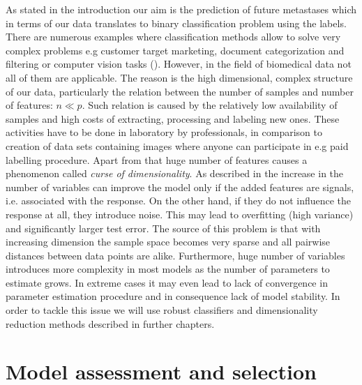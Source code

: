 \documentclass[shortabstract, english, mgr]{iithesis}
\begin{document}
As stated in the introduction our aim is the prediction of future metastases which in terms of our data translates to binary classification problem using the labels. There are numerous examples where classification methods allow to solve very complex problems e.g customer target marketing, document categorization and filtering or computer vision tasks (\cite{dataClassification}). However, in the field of biomedical data not all of them are applicable. The reason is the high dimensional, complex structure of our data, particularly the relation between the number of samples and number of features: $n \ll p$. Such relation is caused by the relatively low availability of samples and high costs of extracting, processing and labeling new ones. These activities have to be done in laboratory by professionals, in comparison to creation of data sets containing images where anyone can participate in e.g paid labelling procedure. Apart from that huge number of features causes a phenomenon called \textit{curse of dimensionality}. As described in \cite[chapter 6.4.3]{ISL} the increase in the number of variables can improve the model only if the added features are signals, i.e. associated with the response. On the other hand, if they do not influence the response at all, they introduce noise. This may lead to overfitting (high variance) and significantly larger test error. The source of this problem is that with increasing dimension the sample space becomes very sparse and all pairwise distances between data points are alike. Furthermore, huge number of variables introduces more complexity in most models as the number of parameters to estimate grows. In extreme cases it may even lead to lack of convergence in parameter estimation procedure and in consequence lack of model stability. In order to tackle this issue we will use robust classifiers and dimensionality reduction methods described in further chapters.

\section{Model assessment and selection} \label{section:selection}
\end{document}

